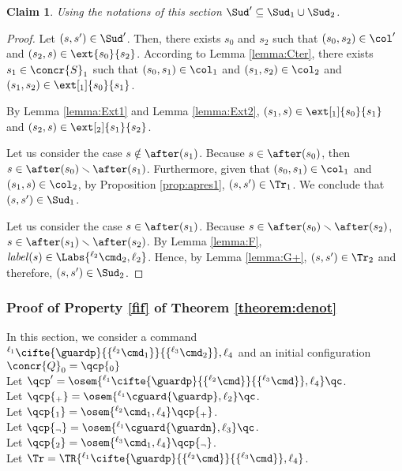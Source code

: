 \documentclass[12pt]{article}
\let\firstunion\cup
\let\cup\firstunion
\renewcommand{\subset}{\subseteq}
\newcommand{\li}[1]{ {}^{\ell_{#1}}  }
\newcommand{\lbl}{\mathit{label}}
\newtheorem{claim}{Claim}
\begin{document}
\begin{claim}\label{lemma:seq:sub}
 Using the notations of this section \(\Sud'\subset \Sud_1\cup\Sud_2 \).
\end{claim}
\begin{proof}
 Let \((s,s')\in\Sud'\). Then, there exists \(s_0\) and \(s_2\) such that 
\((s_0,s_2)\in\col'\) and 
\((s_2,s)\in \ext{s_0}{s_2}\).
According to Lemma \ref{lemma:Cter}, there exists \(s_1\in\concr{S}_1\) such that
\((s_0,s_1)\in\col_1\) and \((s_1,s_2)\in\col_2\) and \((s_1,s_2)\in \ext[_1]{s_0}{s_1}\).

By Lemma \ref{lemma:Ext1} and Lemma \ref{lemma:Ext2}, \((s_1,s)\in\ext[_1]{s_0}{s_1}\) and \((s_2,s)\in\ext[_2]{s_1}{s_2}\).


Let us consider the case \(s\notin\after(s_1)\).
Because \(s\in\after(s_0)\), then \(s\in\after(s_0)\smallsetminus\after(s_1)\).
Furthermore, given that \((s_0,s_1)\in\col_1\) and \((s_1,s)\in\col_2\), by Proposition \ref{prop:apres1}, \((s,s')\in\Tr_1\).
We conclude that \((s,s')\in\Sud_1\).

Let us consider the case \(s\in\after(s_1)\). Because \(s\in\after(s_0)\smallsetminus\after(s_2)\), \(s\in\after(s_1)\smallsetminus\after(s_2)\).
By Lemma \ref{lemma:F}, \(\lbl(s)\in\Labs{\li2\cmd_2,\ell_2}\). Hence, by Lemma \ref{lemma:G+}, \((s,s')\in\Tr_2\) and therefore, \((s,s')\in\Sud_2\).
\end{proof}
 

\subsubsection{Proof of Property \ref{fif} of Theorem \ref{theorem:denot}} 
In this section, we consider a command \(\li1 \cifte{\guardp}{\{\li2\cmd_1\}}{\{\li3\cmd_2\}},\ell_4\) and an initial configuration \(\concr{Q}_0=\qcp{_0}\)\\

Let \(\qcp'=\osem{\li1 \cifte{\guardp}{\{\li2\cmd\}}{\{\li3\cmd\}},\ell_4}\qc\).\\
Let \(\qcp{_{{+}}}=\osem{\li1 \cguard{\guardp},\ell_2}\qc\).\\
Let \(\qcp{_1}=\osem{\li2 \cmd_1,\ell_4}\qcp{_{{+}}}\).\\
Let \(\qcp{_{\neg}}=\osem{\li1 \cguard{\guardn},\ell_3}\qc\).\\
Let \(\qcp{_2}=\osem{\li3 \cmd_1,\ell_4}\qcp{_{\neg}}\).\\
Let \(\Tr=\TR{\li1 \cifte{\guardp}{\{\li2\cmd\}}{\{\li3\cmd\}},\ell_4}\).
\end{document}
